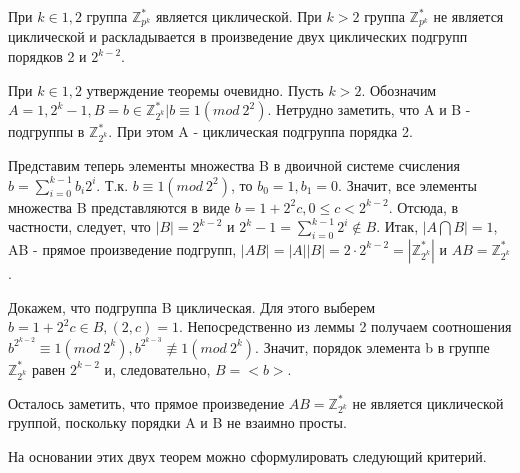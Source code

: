 \begin{proofs}
	При $k \in {1,2}$ группа $\mathbb{Z}_{p^{k}}^{*}$ является циклической. При $k > 2$ группа $\mathbb{Z}_{p^{k}}^{*}$ не является циклической и раскладывается в произведение двух циклических подгрупп порядков 2 и $2^{k-2}$.
	\begin{dokvo}
		При $k \in {1,2}$ утверждение теоремы очевидно.
		Пусть $k > 2$. Обозначим $A = {1, 2^{k}-1}, B = {b \in \mathbb{Z}_{2^{k}}^{*} | b \equiv 1 (mod\ 2^{2})}$. Нетрудно заметить, что A и B - подгруппы в $\mathbb{Z}_{2^{k}}^{*}$. При этом A - циклическая подгруппа порядка 2.
		
		Представим теперь элементы множества B в двоичной системе счисления $b = \sum_{i=0}^{k-1}b_{i}2^{i}$. Т.к. $b \equiv 1(mod\ 2^2)$, то $b_0 = 1, b_1 = 0$. Значит, все элементы множества B представляются в виде $b = 1 + 2^{2}c, 0 \leq c < 2^{k-2}$. Отсюда, в частности, следует, что $|B| = 2^{k-2}$ и $2^{k}-1 = \sum_{i=0}^{k-1}2^{i} \notin B$.
		Итак, $|A \bigcap B| = 1$, AB - прямое произведение подгрупп, $|AB|=|A||B|=2 \cdot 2^{k-2} = |\mathbb{Z}_{2^{k}}^{*}|$ и $AB = \mathbb{Z}_{2^{k}}^{*}$.
		
		Докажем, что подгруппа B циклическая. Для этого выберем $b = 1 + 2^{2}c \in B, (2,c)=1$. Непосредственно из леммы 2 получаем соотношения $b^{2^{k-2}} \equiv 1 (mod\ 2^{k}), b^{2^{k-3}} \not\equiv 1(mod\ 2^{k})$.
		Значит, порядок элемента b в группе $\mathbb{Z}_{2^{k}}^{*}$ равен $2^{k-2}$ и, следовательно, $B=<b>$.
		
		Осталось заметить, что прямое произведение $AB = \mathbb{Z}_{2^{k}}^{*}$ не является циклической группой, поскольку порядки A и B не взаимно просты.
	\end{dokvo}
\end{proofs}

На основании этих двух теорем можно сформулировать следующий критерий.

